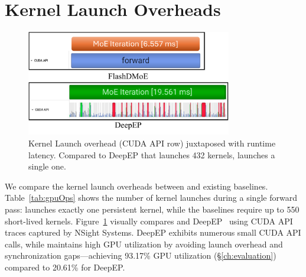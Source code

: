 \section{Kernel Launch Overheads}\label{sec:kernel-launch-overheads}
\begin{figure}[!ht]
    \centering
    \includegraphics[width=0.8\textwidth, keepaspectratio]{figures/kernel_launch}
    \caption{Kernel Launch overhead (CUDA API row) juxtaposed with runtime latency.
    Compared to DeepEP that launches 432 kernels, \sysname launches a single one.}
    \label{fig:kl}
\end{figure}
We compare the kernel launch overheads between \sysname and existing baselines.
Table~\ref{tab:gpuOps} shows the number of kernel launches during a single forward pass: 
\sysname launches exactly one persistent kernel, 
while the baselines require up to 550 short-lived kernels.
Figure~\ref{fig:kl} visually compares \sysname and DeepEP~\cite{deepep} using CUDA API
traces captured by NSight Systems.
DeepEP exhibits numerous small CUDA API calls, while \sysname maintains high GPU
utilization by avoiding launch overhead and
synchronization gaps—achieving 93.17\% GPU utilization (\S\ref{ch:evaluation}) compared to 20.61\% for DeepEP.
